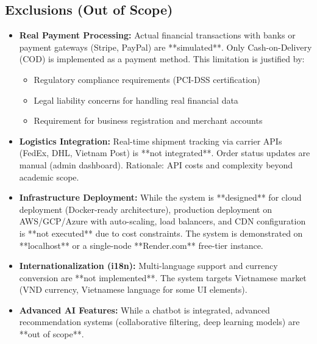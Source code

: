 \documentclass[12pt, a4paper]{report}
\begin{document}
\subsection{Exclusions (Out of Scope)}

\begin{itemize}
    \item \textbf{Real Payment Processing:} Actual financial transactions with banks or payment gateways (Stripe, PayPal) are **simulated**. Only Cash-on-Delivery (COD) is implemented as a payment method. This limitation is justified by:
    \begin{itemize}
        \item Regulatory compliance requirements (PCI-DSS certification)
        \item Legal liability concerns for handling real financial data
        \item Requirement for business registration and merchant accounts
    \end{itemize}
    
    \item \textbf{Logistics Integration:} Real-time shipment tracking via carrier APIs (FedEx, DHL, Vietnam Post) is **not integrated**. Order status updates are manual (admin dashboard). Rationale: API costs and complexity beyond academic scope.
    
    \item \textbf{Infrastructure Deployment:} While the system is **designed** for cloud deployment (Docker-ready architecture), production deployment on AWS/GCP/Azure with auto-scaling, load balancers, and CDN configuration is **not executed** due to cost constraints. The system is demonstrated on **localhost** or a single-node **Render.com** free-tier instance.
    
    \item \textbf{Internationalization (i18n):} Multi-language support and currency conversion are **not implemented**. The system targets Vietnamese market (VND currency, Vietnamese language for some UI elements).
    
    \item \textbf{Advanced AI Features:} While a chatbot is integrated, advanced recommendation systems (collaborative filtering, deep learning models) are **out of scope**.
\end{itemize}



\end{document}

